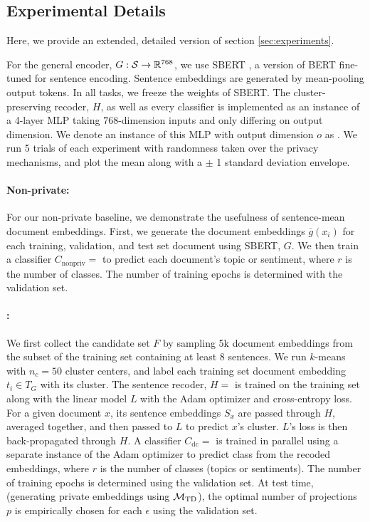
\subsection{Experimental Details}

Here, we provide an extended, detailed version of section \ref{sec:experiments}. 

For the general encoder, $G:\mathcal{S} \rightarrow {\mathbb R}^{768}$, we use SBERT \cite{sbert}, a version of BERT fine-tuned for sentence encoding. Sentence embeddings are generated by mean-pooling output tokens. In all tasks, we freeze the weights of SBERT. The cluster-preserving recoder, $H$, as well as every classifier is implemented as an instance of a 4-layer MLP taking $768$-dimension inputs and only differing on output dimension. We denote an instance of this MLP with output dimension $o$ as . We run 5 trials of each experiment with randomness taken over the privacy mechanisms, and plot the mean along with a $\pm$ 1 standard deviation envelope. 

\paragraph{Non-private:} For our non-private baseline, we demonstrate the usefulness of sentence-mean document embeddings. First, we generate the document embeddings $\overline{g}(x_i)$ for each training, validation, and test set document using SBERT, $G$. We then train a classifier $C_{\text{nonpriv}} = $  to predict each document's topic or sentiment, where $r$ is the number of classes. The number of training epochs is determined with the validation set. 

\paragraph{\technique :} We first collect the candidate set $F$ by sampling 5k document embeddings from the subset of the training set containing at least 8 sentences. We run $k$-means with $n_c = 50$ cluster centers, and label each training set document embedding $t_i \in T_G$ with its cluster. The sentence recoder, $H = $  is trained on the training set along with the linear model $L$ with the Adam optimizer and cross-entropy loss. For a given document $x$, its  sentence embeddings $S_x$ are passed through $H$, averaged together, and then passed to $L$ to predict $x$'s cluster. $L$'s loss is then back-propagated through $H$. A classifier $C_{\text{dc}} = $  is trained in parallel using a separate instance of the Adam optimizer to predict class from the recoded embeddings, where $r$ is the number of classes (topics or sentiments). The number of training epochs is determined using the validation set. At test time, (generating private embeddings using $\mathcal{M}_{\text{TD}}$), the optimal number of projections $p$ is empirically chosen for each $\epsilon$ using the validation set. 

